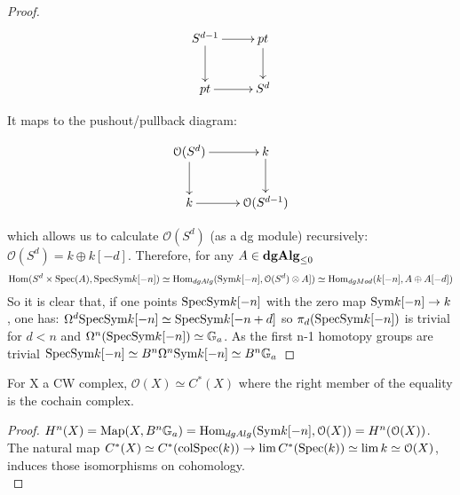 \begin{refsection}
\begin{proof}
\begin{displaymath}
\xymatrix{
S^{d-1} \ar[r] \ar[d] &  pt \ar[d]\\
 pt \ar[r] & S^d\\
}
\end{displaymath}

It maps to the pushout/pullback diagram:

\begin{displaymath}
\xymatrix{
\mathcal{O}(S^{d}) \ar[r] \ar[d] &  k \ar[d]\\
 k \ar[r] & \mathcal{O}(S^{d-1})\\
}
\end{displaymath}

which allows us to calculate $\mathcal{O}(S^d)$ (as a dg module) recursively: $\mathcal{O}(S^d)=k\oplus k[-d]$. Therefore, for any $A \in\mathbf{dgAlg}_{\leq 0}$
$$\mathrm{Hom}(S^d\times \mathrm{Spec}(A),\mathrm{Spec} \text{Sym} k[-n])\simeq \mathrm{Hom}_{dgAlg}(\text{Sym} k[-n],\mathcal{O}(S^d)\otimes A])\simeq \mathrm{Hom}_{dgMod}(k[-n],A\oplus A[-d])$$
So it is clear that, if one points $\mathrm{Spec}\text{Sym} k[-n]$ with the zero map $\text{Sym} k[-n]\to k$, one has:
$\Omega^d \mathrm{Spec} \text{Sym} k[-n]\simeq \mathrm{Spec}\text{Sym} k[-n+d]$ so $\pi_d(\mathrm{Spec} \text{Sym} k[-n])$ is trivial for $d<n$ and $\Omega^n(\mathrm{Spec} \text{Sym} k[-n])\simeq \mathbb{G}_a$.
As the first n-1 homotopy groups are trivial $\mathrm{Spec} \text{Sym} k[-n]\simeq B^n\Omega ^n\text{Sym} k[-n]\simeq B^n\mathbb{G}_a$
\end{proof}


\begin{theorem}
For X a CW complex, $\mathcal{O}(X)\simeq C^*(X)$ where the right member of the equality is the cochain complex.
\end{theorem}

\begin{proof}
$H^n(X)=\operatorname{\mathrm{Map}}(X,B^n\mathbb{G}_a)=\mathrm{Hom}_{dgAlg}(\text{Sym} k[-n],\mathcal{O}(X))=H^n(\mathcal{O}(X))$. The natural map $C^*(X)\simeq C^*(\text{col}\mathrm{Spec}(k))\to \lim C^*(\mathrm{Spec}(k))\simeq \lim k\simeq \mathcal{O}(X)$,
induces those isomorphisms on cohomology.\\
\end{proof}


\end{refsection}
